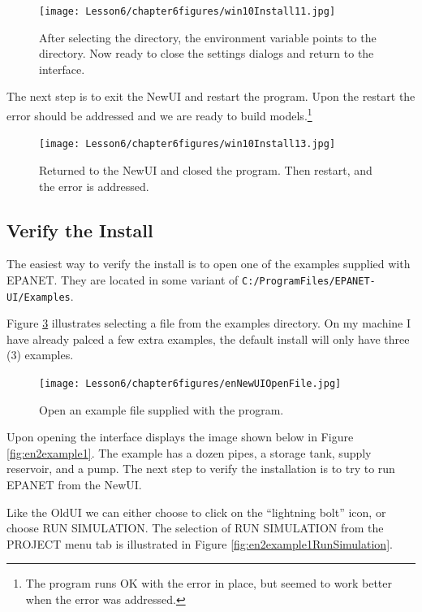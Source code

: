 \begin{figure}[h!] %
   \centering
   \texttt{[image: Lesson6/chapter6figures/win10Install11.jpg]} 
   \caption{After selecting the directory, the environment variable points to the directory.  Now ready to close the settings dialogs and return to the interface.}
   \label{fig:win10Install11}
\end{figure}

The next step is to exit the NewUI and restart the program.  Upon the restart the error should be addressed and we are ready to build models.\footnote{The program runs OK with the error in place, but seemed to work better when the error was addressed.}

\begin{figure}[h!] %
   \centering
   \texttt{[image: Lesson6/chapter6figures/win10Install13.jpg]} 
   \caption{Returned to the NewUI and closed the program.  Then restart, and the error is addressed.}
   \label{fig:win10Install13}
\end{figure}
\clearpage

\subsection{Verify the Install}
The easiest way to verify the install is to open one of the examples supplied with EPANET.   
They are located in some variant of \texttt{C:/ProgramFiles/EPANET-UI/Examples}.

Figure \ref{fig:enNewUIOpenFile} illustrates selecting a file from the examples directory.
On my machine I have already palced a few extra examples, the default install will only have three (3) examples.

\begin{figure}[h!] %
   \centering
   \texttt{[image: Lesson6/chapter6figures/enNewUIOpenFile.jpg]} 
   \caption{Open an example file supplied with the program.}
   \label{fig:enNewUIOpenFile}
\end{figure}

Upon opening the interface displays the image shown below in Figure \ref{fig:en2example1}.
The example has a dozen pipes, a storage tank, supply reservoir, and a pump.
The next step to verify the installation is to try to run EPANET from the NewUI.

Like the OldUI we can either choose to click on the ``lightning bolt'' icon, or choose RUN SIMULATION.
The selection of RUN SIMULATION from the PROJECT menu tab is illustrated in Figure \ref{fig:en2example1RunSimulation}.


